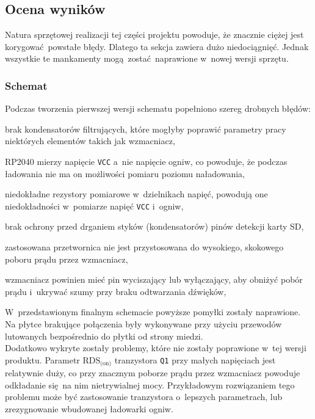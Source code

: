 \documentclass[polish]{aghengthesis}
\let\tempone\itemize
\let\temptwo\enditemize
\renewenvironment{itemize}{\tempone\setlength{\itemsep}{0cm}}{\temptwo}
\begin{document}
		\subsection{Ocena wyników}
			Natura sprzętowej realizacji tej części projektu powoduje, że znacznie ciężej jest korygować powstałe błędy. Dlatego ta sekcja zawiera dużo niedociągnięć. Jednak wszystkie te mankamenty mogą zostać naprawione w~nowej wersji sprzętu.
			
			\subsubsection{Schemat}
				\noindent
				Podczas tworzenia pierwszej wersji schematu popełniono szereg drobnych błędów:
				\begin{itemize}
					\item brak kondensatorów filtrujących, które mogłyby poprawić parametry pracy niektórych elementów takich jak wzmacniacz,
					\item RP2040 mierzy napięcie \lstinline|VCC| a~nie napięcie ogniw, co powoduje, że podczas ładowania nie ma on możliwości pomiaru poziomu naładowania,
					\item niedokładne rezystory pomiarowe w~dzielnikach napięć, powodują one niedokładności w~pomiarze napięć \lstinline|VCC| i~ogniw,
					\item brak ochrony przed drganiem styków (kondensatorów) pinów detekcji karty SD,
					\item zastosowana przetwornica nie jest przystosowana do wysokiego, skokowego poboru prądu przez wzmacniacz,
					\item wzmacniacz powinien mieć pin wyciszający lub wyłączający, aby obniżyć pobór prądu i~ukrywać szumy przy braku odtwarzania dźwięków,
				\end{itemize}
				
				W~przedstawionym finalnym schemacie powyższe pomyłki zostały naprawione. Na płytce brakujące połączenia były wykonywane przy użyciu przewodów lutowanych bezpośrednio do płytki od strony miedzi.
				$ $\\
				
				Dodatkowo wykryte zostały problemy, które nie zostały poprawione w~tej wersji produktu. Parametr $\text{RDS}_{\text{(on)}}$ tranzystora \lstinline|Q1| przy małych napięciach jest relatywnie duży, co przy znacznym poborze prądu przez wzmacniacz powoduje odkładanie się na nim nietrywialnej mocy. Przykładowym rozwiązaniem tego problemu może być zastosowanie tranzystora o~lepszych parametrach, lub zrezygnowanie wbudowanej ładowarki ogniw.
				$ $\\
				
\end{document}
